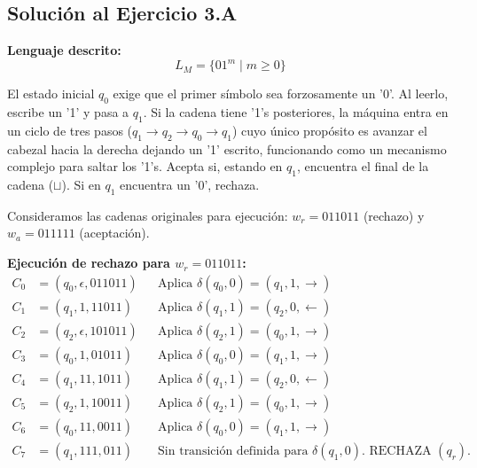
\subsection{Solución al Ejercicio 3.A}

\textbf{Lenguaje descrito:}
\[ L_M = \{01^m \mid m \geq 0\} \]

El estado inicial $q_0$ exige que el primer símbolo sea forzosamente un '0'. Al leerlo, escribe un '1' y pasa a $q_1$. Si la cadena tiene '1's posteriores, la máquina entra en un ciclo de tres pasos ($q_1 \to q_2 \to q_0 \to q_1$) cuyo único propósito es avanzar el cabezal hacia la derecha dejando un '1' escrito, funcionando como un mecanismo complejo para saltar los '1's. Acepta si, estando en $q_1$, encuentra el final de la cadena ($\sqcup$). Si en $q_1$ encuentra un '0', rechaza.

Consideramos las cadenas originales para ejecución:
$w_r = 011011$ (rechazo) y $w_a = 011111$ (aceptación).

\vspace{0.3cm}
\noindent\textbf{Ejecución de rechazo para $w_r = 011011$:}
\begin{align*}
    C_0 &= (q_0, \epsilon, 011011) && \text{Aplica } \delta(q_0, 0) = (q_1, 1, \to) \\
    C_1 &= (q_1, 1, 11011) && \text{Aplica } \delta(q_1, 1) = (q_2, 0, \leftarrow) \\
    C_2 &= (q_2, \epsilon, 101011) && \text{Aplica } \delta(q_2, 1) = (q_0, 1, \to) \\
    C_3 &= (q_0, 1, 01011) && \text{Aplica } \delta(q_0, 0) = (q_1, 1, \to) \\
    C_4 &= (q_1, 11, 1011) && \text{Aplica } \delta(q_1, 1) = (q_2, 0, \leftarrow) \\
    C_5 &= (q_2, 1, 10011) && \text{Aplica } \delta(q_2, 1) = (q_0, 1, \to) \\
    C_6 &= (q_0, 11, 0011) && \text{Aplica } \delta(q_0, 0) = (q_1, 1, \to) \\
    C_7 &= (q_1, 111, 011) && \text{Sin transición definida para } \delta(q_1, 0). \text{ RECHAZA } (q_r).
\end{align*}

